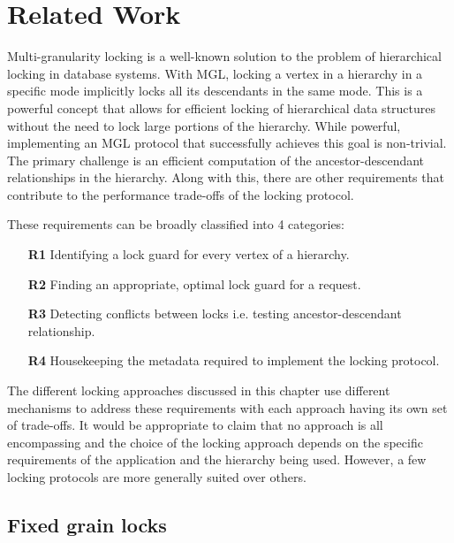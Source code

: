 \chapter{Related Work} \label{chap:relatedwork}

Multi-granularity locking is a well-known solution to the problem of hierarchical locking in database systems. 
With MGL, locking a vertex in a hierarchy in a specific mode implicitly locks all its descendants in the same mode. 
This is a powerful concept that allows for efficient locking of hierarchical data structures without the need to lock large portions of the hierarchy.
While powerful, implementing an MGL protocol that successfully achieves this goal is non-trivial. 
The primary challenge is an efficient computation of the ancestor-descendant relationships in the hierarchy. 
Along with this, there are other requirements that contribute to the performance trade-offs of the locking protocol. 



These requirements can be broadly classified into 4 categories:
\begin{itemize}
    \item[\textbf{R1}] Identifying a lock guard for every vertex of a hierarchy.
    \item[\textbf{R2}] Finding an appropriate, optimal lock guard for a request.
    \item[\textbf{R3}] Detecting conflicts between locks i.e. testing ancestor-descendant relationship.
    \item[\textbf{R4}] Housekeeping the metadata required to implement the locking protocol.
\end{itemize}
The different locking approaches discussed in this chapter use different mechanisms to address these requirements with each approach having its own set of trade-offs. 
It would be appropriate to claim that no approach is all encompassing and the choice of the locking approach depends on the specific requirements of the application and the hierarchy being used. 
However, a few locking protocols are more generally suited over others. 

\section{Fixed grain locks}

